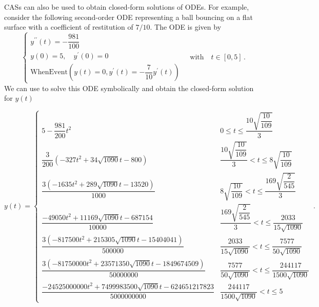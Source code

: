 \begin{example}
\acp{CAS} can also be used to obtain closed-form solutions of \acp{ODE}. For example, consider the following second-order \ac{ODE} representing a ball bouncing on a flat surface with a coefficient of restitution of $7/10$. The \ac{ODE} is given by
%
\begin{equation*}
  \begin{cases}
    y^{\prime\prime}(t) = -\dfrac{981}{100} \\[0.1em]
    y(0) = 5, \quad y^{\prime}(0) = 0 \\[0.1em]
    \mathrm{WhenEvent}(y(t) = 0, y^{\prime}(t) = -\dfrac{7}{10}y^{\prime}(t))
  \end{cases}
  \quad \text{with} \quad t \in [0, 5] \, \text{.}
\end{equation*}
%
We can use \Mathematica{} to solve this \ac{ODE} symbolically and obtain the closed-form solution for $y(t)$
%
\begin{footnotesize}
  \begin{equation*}
    y(t) = \begin{cases}
      5-\dfrac{981}{200}t^2 &
        0\leq t\leq \dfrac{10 \sqrt{\dfrac{10}{109}}}{3} \\[0.2em]
      \dfrac{3}{200} \left(-327 t^2+34 \sqrt{1090} t-800\right) &
        \dfrac{10\sqrt{\dfrac{10}{109}}}{3}<t\leq 8 \sqrt{\dfrac{10}{109}} \\[0.2em]
      \dfrac{3 \left(-1635 t^2+289 \sqrt{1090} t-13520\right)}{1000} &
        8\sqrt{\dfrac{10}{109}}<t\leq \dfrac{169 \sqrt{\dfrac{2}{545}}}{3} \\[0.2em]
      \dfrac{-49050 t^2+11169 \sqrt{1090} t-687154}{10000} &
        \dfrac{169\sqrt{\dfrac{2}{545}}}{3}<t\leq \dfrac{2033}{15 \sqrt{1090}} \\[0.2em]
      \dfrac{3 \left(-817500 t^2+215305 \sqrt{1090} t-15404041\right)}{500000} &
        \dfrac{2033}{15\sqrt{1090}}<t\leq \dfrac{7577}{50 \sqrt{1090}} \\[0.2em]
      \dfrac{3 \left(-81750000 t^2+23571350 \sqrt{1090} t-1849674509\right)}{50000000} &
        \dfrac{7577}{50 \sqrt{1090}}<t\leq \dfrac{244117}{1500 \sqrt{1090}} \\[0.2em]
      \dfrac{-24525000000 t^2+7499983500 \sqrt{1090} t-624651217823}{5000000000} &
        \dfrac{244117}{1500 \sqrt{1090}}<t\leq 5
      \end{cases} \, \text{.}
  \end{equation*}
\end{footnotesize}


\end{example}
